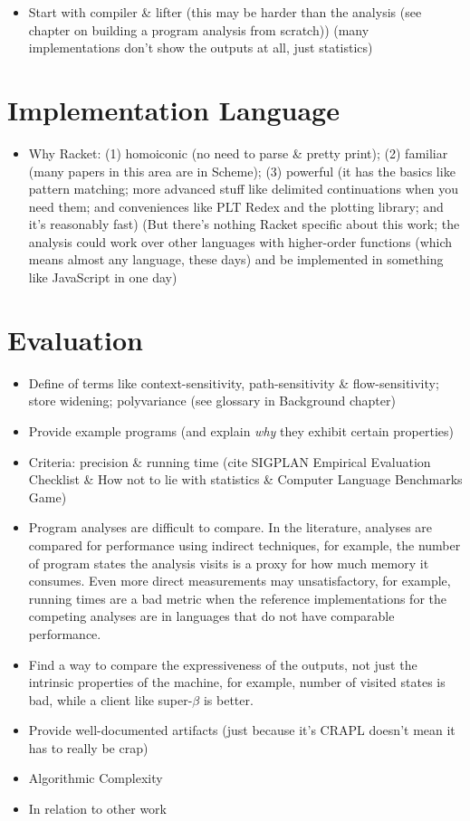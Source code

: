 \documentclass[12pt, oneside]{book}
\begin{document}
\begin{itemize}
  \item Start with compiler \& lifter (this may be harder than the analysis (see chapter on building a program analysis from scratch)) (many implementations don’t show the outputs at all, just statistics)
\end{itemize}

\section{Implementation Language}
\label{section:implementation-language}

\begin{itemize}
  \item Why Racket: (1) homoiconic (no need to parse \& pretty print); (2) familiar (many papers in this area are in Scheme); (3) powerful (it has the basics like pattern matching; more advanced stuff like delimited continuations when you need them; and conveniences like PLT Redex and the plotting library; and it’s reasonably fast) (But there’s nothing Racket specific about this work; the analysis could work over other languages with higher-order functions (which means almost any language, these days) and be implemented in something like JavaScript in one day)
\end{itemize}

\section{Evaluation}

\begin{itemize}
  \item Define of terms like context-sensitivity, path-sensitivity \& flow-sensitivity; store widening; polyvariance (see glossary in Background chapter)
  \item Provide example programs (and explain \emph{why} they exhibit certain properties)
  \item Criteria: precision \& running time (cite SIGPLAN Empirical Evaluation Checklist \& How not to lie with statistics \& Computer Language Benchmarks Game)
  \item Program analyses are difficult to compare. In the literature, analyses are compared for performance using indirect techniques, for example, the number of program states the analysis visits is a proxy for how much memory it consumes. Even more direct measurements may unsatisfactory, for example, running times are a bad metric when the reference implementations for the competing analyses are in languages that do not have comparable performance.
  \item Find a way to compare the expressiveness of the outputs, not just the intrinsic properties of the machine, for example, number of visited states is bad, while a client like super-\(β\) is better.
  \item Provide well-documented artifacts (just because it’s CRAPL doesn’t mean it has to really be crap)
  \item Algorithmic Complexity
  \item In relation to other work
\end{itemize}
\end{document}
